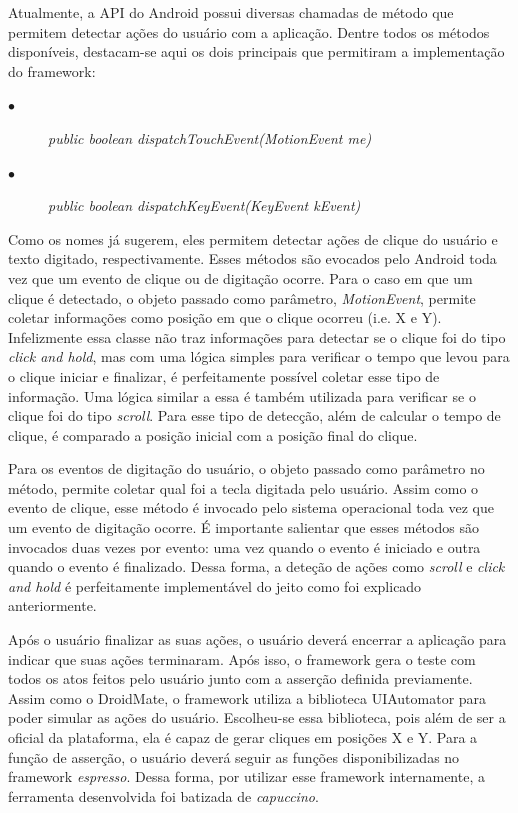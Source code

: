 \documentclass[
    12pt,       %
    openright,      %
    twoside,      %
    a4paper,      %
    english,      %
    french,       %
    spanish,      %
    brazil,       %
    ]{abntex2}
\begin{document}
        Atualmente, a API do Android possui diversas chamadas de método que permitem detectar
        ações do usuário com a aplicação. Dentre todos os métodos disponíveis, destacam-se aqui
        os dois principais que permitiram a implementação do framework: \par
        \begin{description}
          \item[$\bullet$] \textit{public boolean dispatchTouchEvent(MotionEvent me)}
          \item[$\bullet$] \textit{public boolean dispatchKeyEvent(KeyEvent kEvent)}
        \end{description}

        Como os nomes já sugerem, eles permitem detectar ações de clique do usuário
        e texto digitado, respectivamente. Esses métodos são evocados pelo Android toda
        vez que um evento de clique ou de digitação ocorre. Para o caso em que um clique
        é detectado, o objeto passado como parâmetro, \textit{MotionEvent}, permite coletar
        informações como posição em que o clique ocorreu (i.e. X e Y). Infelizmente essa classe
        não traz informações para detectar se o clique foi do tipo \textit{click and hold}, mas
        com uma lógica simples para verificar o tempo que levou para o clique iniciar e
        finalizar, é perfeitamente possível coletar esse tipo de informação. Uma lógica similar
        a essa é também utilizada para verificar se o clique foi do tipo \textit{scroll}. Para
        esse tipo de detecção, além de calcular o tempo de clique, é comparado a posição inicial
        com a posição final do clique.

        Para os eventos de digitação do usuário, o objeto passado como parâmetro no método, permite
        coletar qual foi a tecla digitada pelo usuário. Assim como o evento de clique, esse método é
        invocado pelo sistema operacional toda vez que um evento de digitação ocorre. É importante
        salientar que esses métodos são invocados duas vezes por evento: uma vez quando o evento é
        iniciado e outra quando o evento é finalizado. Dessa forma, a deteção de ações como
        \textit{scroll} e \textit{click and hold} é perfeitamente implementável do jeito como foi
        explicado anteriormente.

        Após o usuário finalizar as suas ações, o usuário deverá encerrar a aplicação para indicar
        que suas ações terminaram. Após isso, o framework gera o teste com todos os atos feitos pelo usuário
        junto com a asserção definida previamente. Assim como o DroidMate, o framework utiliza
        a biblioteca UIAutomator para poder simular as ações do usuário. Escolheu-se essa biblioteca,
        pois além de ser a oficial da plataforma, ela é capaz de gerar cliques em posições X e Y.
        Para a função de asserção, o usuário deverá seguir as funções disponibilizadas no framework
        \textit{espresso}. Dessa forma, por utilizar esse framework internamente, a ferramenta
        desenvolvida foi batizada de \textit{capuccino}.
\end{document}
